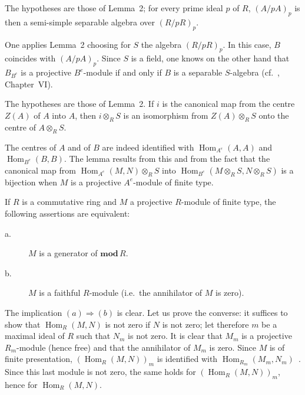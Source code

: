 \begin{lemma}
The hypotheses are those of Lemma~2; for every prime ideal $p$ of $R$,
$(A/pA)_p$ is then a semi-simple separable algebra over $(R/pR)_p$.
\end{lemma}

One applies Lemma~2 choosing for $S$ the algebra $(R/pR)_p$.  In this
case, $B$ coincides with $(A/pA)_p$.  Since $S$ is a field, one knows
on the other hand that $B_{B^e}$ is a projective $B^e$-module if and
only if $B$ is a separable $S$-algebra
(cf.~\cite{cartan-eilenberg}, Chapter~VI).

\begin{lemma}
The hypotheses are those of Lemma~2.  If $i$ is the canonical map from
the centre $Z(A)$ of $A$ into $A$, then $i\otimes_R S$ is an
isomorphism from $Z(A)\otimes_R S$ onto the centre of $A\otimes_R S$.
\end{lemma}

The centres of $A$ and of $B$ are indeed identified with
$\operatorname{Hom}_{A^e}(A,A)$ and $\operatorname{Hom}_{B^e}(B,B)$.
The lemma results from this and from the fact that the canonical map
from $\operatorname{Hom}_{A^e}(M,N)\otimes_R S$ into
$\operatorname{Hom}_{B^e}(M\otimes_R S,N\otimes_R S)$ is a bijection
when $M$ is a projective $A^e$-module of finite type.

\begin{lemma}
If $R$ is a commutative ring and $M$ a projective $R$-module of finite
type, the following assertions are equivalent:
\begin{description}
\item[\normalfont a.] $M$ is a generator of $\mathbf{mod}\,R$.
\item[\normalfont b.] $M$ is a faithful $R$-module (i.e.\ the
      annihilator of $M$ is zero).
\end{description}
\end{lemma}

The implication $(a)\Rightarrow(b)$ is clear.  Let us prove the
converse: it suffices to show that $\operatorname{Hom}_R(M,N)$ is not
zero if $N$ is not zero; let therefore $m$ be a maximal ideal of $R$
such that $N_m$ is not zero.  It is clear that $M_m$ is a projective
$R_m$-module (hence free) and that the annihilator of $M_m$ is zero.
Since $M$ is of finite presentation,
$(\operatorname{Hom}_R(M,N))_m$ is identified with
$\operatorname{Hom}_{R_m}(M_m,N_m)$~\cite{bourbaki-commutative}.
Since this last module is not zero, the same holds for
$(\operatorname{Hom}_R(M,N))_m$, hence for
$\operatorname{Hom}_R(M,N)$.

